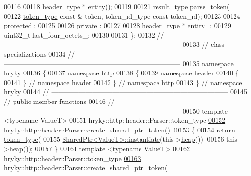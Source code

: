 \begin{DoxyCode}
00116     
00118     \hyperlink{classhryky_1_1http_1_1header_1_1_entity}{header_type} * \hyperlink{classhryky_1_1http_1_1header_1_1_parser_a141af3e67b7df44941b5cf2536ecce6b}{entity}();
00119     
00121     result\_type \hyperlink{classhryky_1_1http_1_1header_1_1_parser_ac5cb77a42333648c7e8229fdece7b052}{parse_token}(
00122         \hyperlink{classhryky_1_1_vector}{token_type} \textcolor{keyword}{const} & token, token\_id\_type \textcolor{keyword}{const} token\_id);
00123 
00124 \textcolor{keyword}{protected} :
00125 
00126 \textcolor{keyword}{private} :
00127 
00128     \hyperlink{classhryky_1_1http_1_1header_1_1_entity}{header_type} * entity\_;
00129     uint32\_t last\_four\_octets\_;
00130 
00131 \};
00132 \textcolor{comment}{//
      ------------------------------------------------------------------------------}
00133 \textcolor{comment}{// class specializations}
00134 \textcolor{comment}{//
      ------------------------------------------------------------------------------}
00135 \textcolor{keyword}{namespace }hryky
00136 \{
00137 \textcolor{keyword}{namespace }http
00138 \{
00139 \textcolor{keyword}{namespace }header
00140 \{
00141 \} \textcolor{comment}{// namespace header}
00142 \} \textcolor{comment}{// namespace http}
00143 \} \textcolor{comment}{// namespace hryky}
00144 \textcolor{comment}{//
      ------------------------------------------------------------------------------}
00145 \textcolor{comment}{// public member functions}
00146 \textcolor{comment}{//
      ------------------------------------------------------------------------------}
00150 \textcolor{comment}{}\textcolor{keyword}{template} <\textcolor{keyword}{typename} ValueT>
00151 hryky::http::header::Parser::token\_type
\hypertarget{http__header__parser_8h_source_l00152}{}\hyperlink{classhryky_1_1http_1_1header_1_1_parser_a0593e9a0e2cd945d715cfbaf0a3f2fdb}{00152} \hyperlink{classhryky_1_1http_1_1header_1_1_parser_a0593e9a0e2cd945d715cfbaf0a3f2fdb}{hryky::http::header::Parser::create_shared_ptr_token}()
00153 \{
00154     \textcolor{keywordflow}{return} \hyperlink{classhryky_1_1_vector}{token_type}(
00155         \hyperlink{classhryky_1_1_shared_ptr}{SharedPtr<ValueT>::instantiate}(this->\hyperlink{classhryky_1_1parser_1_1_base_ade0723cedb648d9850423cc04fe4bdcf}{heap}()),
00156         this->\hyperlink{classhryky_1_1parser_1_1_base_ade0723cedb648d9850423cc04fe4bdcf}{heap}());
00157 \}
00161 \textcolor{keyword}{template} <\textcolor{keyword}{typename} ValueT>
00162 hryky::http::header::Parser::token\_type
\hypertarget{http__header__parser_8h_source_l00163}{}\hyperlink{classhryky_1_1http_1_1header_1_1_parser_ab787930a2806672fdec7f55975e9e57f}{00163} \hyperlink{classhryky_1_1http_1_1header_1_1_parser_a0593e9a0e2cd945d715cfbaf0a3f2fdb}{hryky::http::header::Parser::create_shared_ptr_token}(

\end{DoxyCode}
